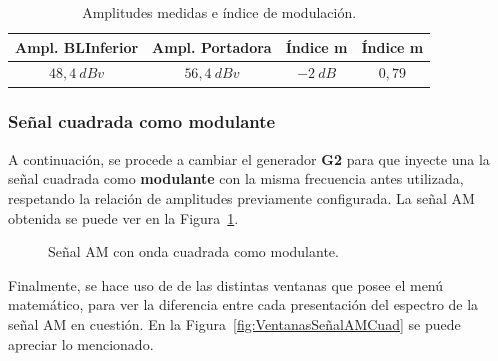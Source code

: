       \begin{table}[H]
        \centering
      \begin{tabular}{cccc} \hline \hline
          \textbf{Ampl. BLInferior}    &   \textbf{Ampl. Portadora}  &  \textbf{Índice m}  & \textbf{Índice m}  \\ \hline
          $48,4~dBv$   &   $56,4~dBv$   &    $-2~dB$   &   $0,79$   \\ \hline \hline
        \end{tabular}
        \caption{Amplitudes medidas e índice de modulación.}
        \label{tab:MedicionesAmplitAMSeno}
      \end{table}


    \subsubsection{Señal cuadrada como modulante}
      A continuación, se procede a cambiar el generador \textbf{G2} para que inyecte una la señal cuadrada
      como \textbf{modulante} con la misma frecuencia antes utilizada, respetando la relación de amplitudes
      previamente configurada. La señal AM obtenida se puede ver en la Figura~\ref{fig:SeñalAMConCuadrada}.

      \begin{figure}[H]
        \centering
        \caption{Señal AM con onda cuadrada como modulante.}
        \label{fig:SeñalAMConCuadrada}
      \end{figure}

      Finalmente, se hace uso de de las distintas ventanas que posee el menú matemático, para ver la diferencia
      entre cada presentación del espectro de la señal AM en cuestión. En la Figura~\ref{fig:VentanasSeñalAMCuad}
      se puede apreciar lo mencionado.


